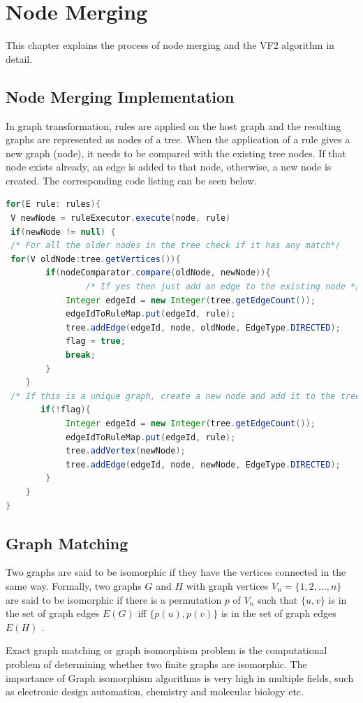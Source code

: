 \chapter{Node Merging} \label{nodemerging}
	This chapter explains the process of node merging and the VF2 algorithm in detail.

\section{Node Merging Implementation}
In graph transformation, rules are applied on the host graph and the resulting graphs are represented as nodes of a tree. When the application of a rule gives a new graph (node), it needs to be compared with the existing tree nodes. If that node exists already, an edge is added to that node, otherwise, a new node is created. The corresponding code listing can be seen below.

\begin{lstlisting}[language = Java,frame = single]
 for(E rule: rules){
 V newNode = ruleExecutor.execute(node, rule)
 if(newNode != null) {
 /* For all the older nodes in the tree check if it has any match*/
 for(V oldNode:tree.getVertices()){  
        if(nodeComparator.compare(oldNode, newNode)){
	            /* If yes then just add an edge to the existing node */
            Integer edgeId = new Integer(tree.getEdgeCount());
     	    edgeIdToRuleMap.put(edgeId, rule);
    	    tree.addEdge(edgeId, node, oldNode, EdgeType.DIRECTED);
            flag = true;
            break;
        }
    }
 /* If this is a unique graph, create a new node and add it to the tree*/
	   if(!flag){
		    Integer edgeId = new Integer(tree.getEdgeCount()); 
    		edgeIdToRuleMap.put(edgeId, rule);	
	    	tree.addVertex(newNode);
		    tree.addEdge(edgeId, node, newNode, EdgeType.DIRECTED);
        }
    }
}
\end{lstlisting}

\section{Graph Matching}
Two graphs are said to be isomorphic if they have the vertices connected in the same way. Formally, two graphs $G$ and $H$ with graph vertices $V_n =\{1,2,...,n\}$ are said to be isomorphic if there is a permutation $p$ of $V_n$ such that $\{u,v\}$ is in the set of graph
edges $E(G)$ iff $\{p(u),p(v)\}$ is in the set of graph edges $E(H)$ \cite{iso1}.

Exact graph matching or graph isomorphism problem is the computational problem of determining whether two finite graphs are isomorphic. The importance of Graph isomorphism algorithms is very high in multiple fields, such as electronic design automation, chemistry and molecular biology etc.

